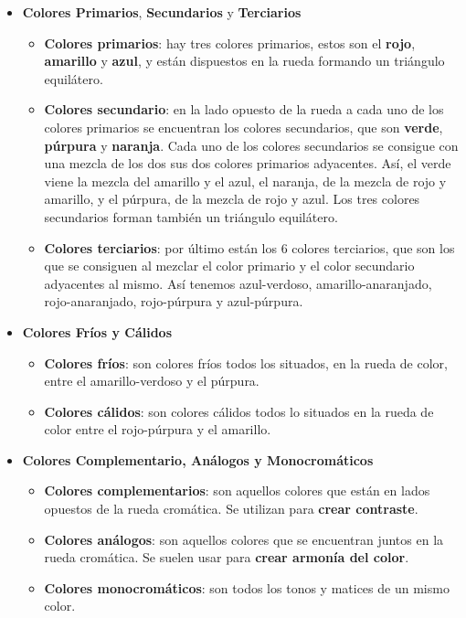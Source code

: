 \begin{itemize}
    \item \textbf{Colores Primarios}, \textbf{Secundarios} y \textbf{Terciarios}

    \begin{itemize}
        \item \textbf{Colores primarios}: hay tres colores primarios, estos son el \textbf{rojo}, \textbf{amarillo} y \textbf{azul}, y están dispuestos en la rueda formando un triángulo equilátero.

        \item \textbf{Colores secundario}: en la lado opuesto de la rueda a cada uno de los colores primarios se encuentran los colores secundarios, que son \textbf{verde}, \textbf{púrpura} y \textbf{naranja}. Cada uno de los colores secundarios se consigue con una mezcla de los dos sus dos colores primarios adyacentes. Así, el verde viene la mezcla del amarillo y el azul, el naranja, de la mezcla de rojo y amarillo, y el púrpura, de la mezcla de rojo y azul. Los tres colores secundarios forman también un triángulo equilátero.

        \item \textbf{Colores terciarios}: por último están los 6 colores terciarios, que son los que se consiguen al mezclar el color primario y el color secundario adyacentes al mismo. Así tenemos azul-verdoso, amarillo-anaranjado,  rojo-anaranjado, rojo-púrpura y azul-púrpura.
    \end{itemize}

    \item \textbf{Colores Fríos y Cálidos}
    \begin{itemize}
        \item \textbf{Colores fríos}: son colores fríos todos los situados, en la rueda de color, entre el amarillo-verdoso y el púrpura.

        \item \textbf{Colores cálidos}: son colores cálidos todos lo situados en la rueda de color entre el rojo-púrpura y el amarillo.
    \end{itemize}

    \item \textbf{Colores Complementario, Análogos y Monocromáticos}
    \begin{itemize}
        \item \textbf{Colores complementarios}: son aquellos colores que están en lados opuestos de la rueda cromática. Se utilizan para \textbf{crear contraste}.

        \item \textbf{Colores análogos}: son aquellos colores que se encuentran juntos en la rueda cromática. Se suelen usar para \textbf{crear armonía del color}.

        \item \textbf{Colores monocromáticos}: son todos los tonos y matices de un mismo color.
    \end{itemize}
\end{itemize}

